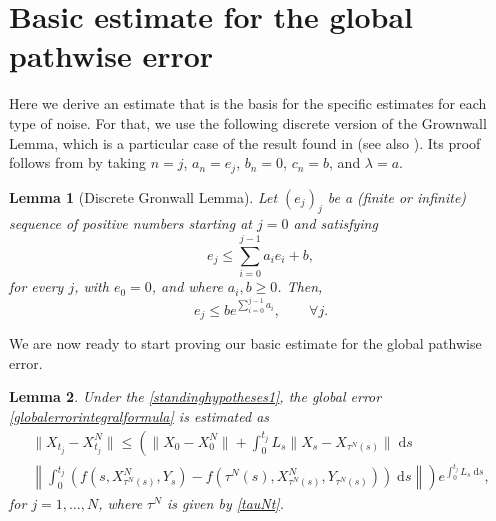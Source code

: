 \documentclass[reqno,12pt]{amsart}
\theoremstyle{plain} %
\newtheorem{lemma}{Lemma}[section]
\theoremstyle{definition} %
\begin{document}
\section{Basic estimate for the global pathwise error}

Here we derive an estimate that is the basis for the specific estimates for each type of noise. For that, we use the following discrete version of the Grownwall Lemma, which is a particular case of the result found in \cite{GiraultRaviart1981} (see also \cite{Clark1987}). Its proof follows from \cite[Lemma V.2.4]{GiraultRaviart1981} by taking $n = j$, $a_n = e_j$, $b_n = 0$, $c_n = b$, and $\lambda = a$.

\begin{lemma}[Discrete Gronwall Lemma]
    \label{lemdiscretegronwall}
    Let $(e_j)_j$ be a (finite or infinite) sequence of positive numbers starting at $j=0$ and satisfying
    \begin{equation}
        \label{integralgronwall}
        e_j \leq \sum_{i=0}^{j-1} a_i e_i + b,
    \end{equation}
    for every $j$, with $e_0 = 0$, and where $a_i, b \geq 0$. Then,
    \begin{equation}
        \label{estimateintegralgronwall}
        e_j \leq b e^{\sum_{i=0}^{j-1} a_i}, \qquad \forall j.
    \end{equation}
\end{lemma}

We are now ready to start proving our basic estimate for the global pathwise error.
\begin{lemma}
    \label{lembasicestimate}
    Under the \cref{standinghypotheses1}, the global error \eqref{globalerrorintegralformula} is estimated as
    \begin{multline}
        \label{Etjbasicbound}
            \|X_{t_j} - X_{t_j}^N\| \leq \left( \|X_0 - X_0^N\| + \int_0^{t_j} L_s\|X_s - X_{\tau^N(s)}\| \;\mathrm{d}s \right. \\
            \left. \left\|\int_0^{t_j} \left( f(s, X_{\tau^N(s)}^N, Y_s) - f(\tau^N(s), X_{\tau^N(s)}^N, Y_{\tau^N(s)}) \right)\;\mathrm{d}s\right\|\right) e^{\int_0^{t_j} L_s\;\mathrm{d}s},
    \end{multline}
    for $j=1, \ldots, N$, where $\tau^N$ is given by \eqref{tauNt}.
\end{lemma}
\end{document}
